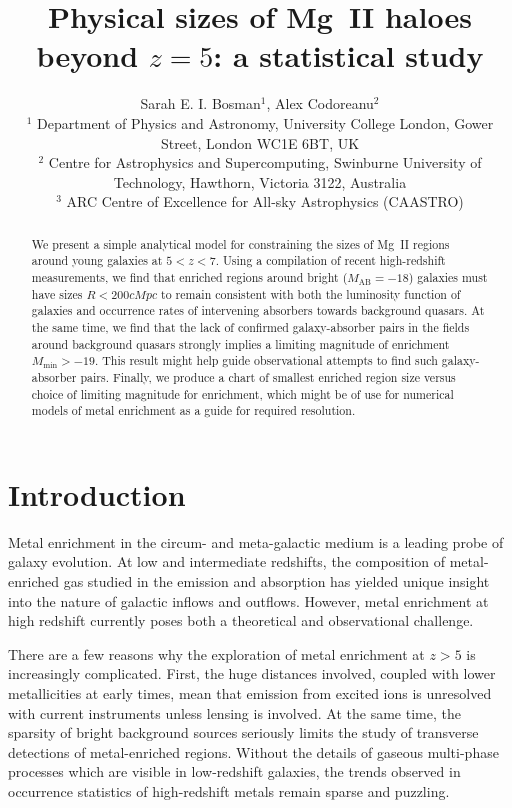 \documentclass[useAMS,usenatbib]{mn2e}
\author[Bosman \& Codoreanu]
  {Sarah E. I. Bosman$^{1}$, Alex Codoreanu$^{2}$
\\
$^{1}$ Department of Physics and Astronomy, University College London, Gower Street, London WC1E 6BT, UK \\
$^{2}$ Centre for Astrophysics and Supercomputing, Swinburne University of Technology, Hawthorn, Victoria 3122, Australia \\
$^{3}$ ARC Centre of Excellence for All-sky Astrophysics (CAASTRO)
}
\title{Physical sizes of Mg~II haloes beyond $z=5$: a statistical study}
\date{}
\newcommand{\magtwo}{Mg~{\small II} }
\begin{document}
\maketitle

\begin{abstract}
We present a simple analytical model for constraining the sizes of \magtwo regions around young galaxies at $5<z<7$. Using a compilation of recent high-redshift measurements, we find that enriched regions around bright ($M_\text{AB} = -18$) galaxies must have sizes $R<200 cMpc$ to remain consistent with both the luminosity function of galaxies and occurrence rates of intervening absorbers towards background quasars. At the same time, we find that the lack of confirmed galaxy-absorber pairs in the fields around background quasars strongly implies a limiting magnitude of enrichment $M_\text{min}>-19$. This result might help guide observational attempts to find such galaxy-absorber pairs. Finally, we produce a chart of smallest enriched region size versus choice of limiting magnitude for enrichment, which might be of use for numerical models of metal enrichment as a guide for required resolution.
\end{abstract}

\section{Introduction}


Metal enrichment in the circum- and meta-galactic medium is a leading probe of galaxy evolution.
At low and intermediate redshifts, the composition of metal-enriched gas studied in the emission and absorption has yielded unique insight into the nature of galactic inflows and outflows.  
However, metal enrichment at high redshift currently poses both a theoretical and observational challenge. 

There are a few reasons why the exploration of metal enrichment at $z>5$ is increasingly complicated. First, the huge distances involved, coupled with lower metallicities at early times, mean that emission from excited ions is unresolved with current instruments unless lensing is involved. At the same time, the sparsity of bright background sources seriously limits the study of transverse detections of metal-enriched regions. Without the details of gaseous multi-phase processes which are visible in low-redshift galaxies, the trends observed in occurrence statistics of high-redshift metals remain sparse and puzzling.
\end{document}

